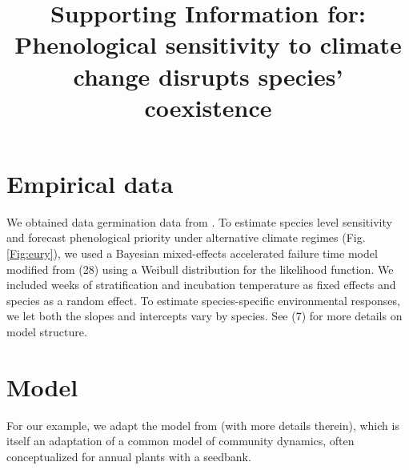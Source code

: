 \documentclass[11pt]{article}
\title{Supporting Information for: Phenological sensitivity to climate change disrupts species' coexistence}
\begin{document}
\maketitle
\renewcommand{\refname}{\CHead{}}


\renewcommand{\thetable}{S\arabic{table}}
\renewcommand{\thefigure}{S\arabic{figure}}

\section*{Empirical data} 
We obtained data germination data from \citet{Buonaiuto2023data}. To estimate species level sensitivity 
and forecast phenological priority under alternative climate regimes (Fig. \ref{Fig:eury}), 
we used a Bayesian mixed-effects accelerated failure time model modified from (28) using a Weibull distribution for the likelihood function. 
We included weeks of stratification and incubation temperature as fixed effects and species as a random effect.
To estimate species-specific environmental responses, we let both the slopes and intercepts vary by species. See (7) for more details on model structure.





\section*{Model} 
For our example, we adapt the model from \citet{wolkovich2021phenological} (with more details therein), which is itself an adaptation of a common model of community dynamics, often conceptualized for annual plants with a seedbank. \\
\end{document}
